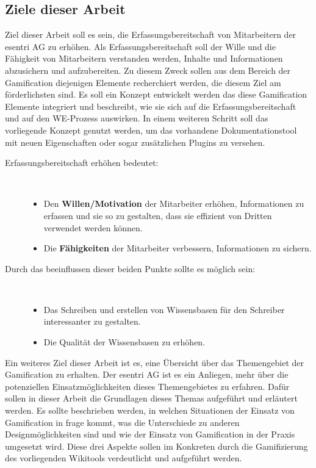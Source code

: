 \documentclass[a4paper,12pt,twoside]{scrartcl}
\begin{document}
\subsection{Ziele dieser Arbeit} 
Ziel dieser Arbeit soll es sein, die Erfassungsbereitschaft von Mitarbeitern der esentri AG zu erhöhen. Als Erfassungsbereitschaft soll der Wille und die Fähigkeit von Mitarbeitern verstanden werden, Inhalte und Informationen abzusichern und aufzubereiten. Zu diesem Zweck sollen aus dem Bereich der Gamification diejenigen Elemente recherchiert werden, die diesem Ziel am förderlichsten sind. Es soll ein Konzept entwickelt werden das diese Gamification Elemente integriert und beschreibt, wie sie sich auf die Erfassungsbereitschaft und auf den WE-Prozess auswirken. In einem weiteren Schritt soll das vorliegende Konzept genutzt werden, um das vorhandene Dokumentationstool mit neuen Eigenschaften oder sogar zusätzlichen Plugins zu versehen.
\begin{description}
   \item[Erfassungsbereitschaft erhöhen bedeutet:]~\par
   \begin{itemize}
      \item Den \textbf{Willen/Motivation} der Mitarbeiter erhöhen, Informationen zu erfassen und sie so zu gestalten, dass sie effizient von Dritten verwendet werden können.  
      \item Die \textbf{Fähigkeiten} der Mitarbeiter verbessern, Informationen zu sichern.
   \end{itemize}
\end{description}

\begin{description}
   \item[Durch das beeinflussen dieser beiden Punkte sollte es möglich sein:]~\par
   \begin{itemize}
      \item Das Schreiben und erstellen von Wissensbasen für den Schreiber interessanter zu gestalten.  
      \item Die Qualität der Wissensbasen zu erhöhen.
   \end{itemize}
\end{description}
Ein weiteres Ziel dieser Arbeit ist es, eine Übersicht über das Themengebiet der Gamification zu erhalten. Der esentri AG ist es ein Anliegen, mehr über die potenziellen Einsatzmöglichkeiten dieses Themengebietes zu erfahren. 
Dafür sollen in dieser Arbeit die Grundlagen dieses Themas aufgeführt und erläutert werden. Es sollte beschrieben werden, in welchen Situationen der Einsatz von Gamification in frage kommt, was die Unterschiede zu anderen Designmöglichkeiten sind und wie der Einsatz von Gamification in der Praxis umgesetzt wird. Diese drei Aspekte sollen im Konkreten durch die Gamifizierung des vorliegenden Wikitools verdeutlicht und aufgeführt werden.
\end{document}
